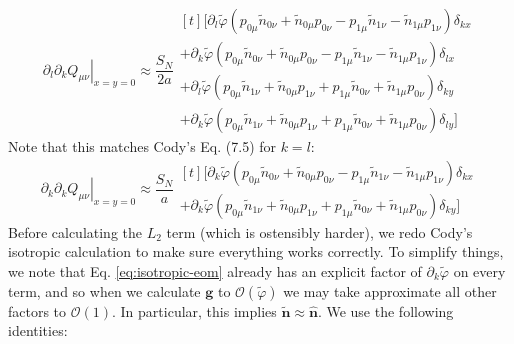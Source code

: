 \documentclass[reqno]{article}
\newcommand{\phitilde}{\tilde{\varphi}}
\begin{document}
\begin{equation}
    \left. \partial_l \partial_k Q_{\mu \nu} \right|_{x = y = 0}
    \approx
    \frac{S_N}{2 a}
    \begin{multlined}[t]
    \biggl[
         \partial_l \phitilde \left( p_{0\mu} \tilde{n}_{0\nu} + \tilde{n}_{0\mu} p_{0\nu} - p_{1\mu} \tilde{n}_{1\nu} - \tilde{n}_{1\mu} p_{1\nu} \right)\delta_{k x} \\
        +  \partial_k \phitilde \left( 
            p_{0\mu} \tilde{n}_{0\nu} + \tilde{n}_{0\mu} p_{0\nu} - p_{1\mu} \tilde{n}_{1\nu} - \tilde{n}_{1\mu} p_{1\nu}
        \right) \delta_{lx} \\
        +  \partial_l \phitilde \left( 
            p_{0\mu} \tilde{n}_{1\nu} + \tilde{n}_{0\mu} p_{1\nu} + p_{1\mu} \tilde{n}_{0\nu} + \tilde{n}_{1\mu} p_{0\nu}
        \right) \delta_{k y} \\
        +  \partial_k \phitilde  \left( 
            p_{0\mu} \tilde{n}_{1\nu} + \tilde{n}_{0\mu} p_{1\nu} + p_{1\mu} \tilde{n}_{0\nu} + \tilde{n}_{1\mu} p_{0\nu}
        \right) \delta_{l y}
    \biggr]
    \end{multlined}
\end{equation}
Note that this matches Cody's Eq. (7.5) for $k = l$:
\begin{equation} \label{eq:isotropic-eom}
    \left. \partial_k \partial_k Q_{\mu \nu} \right|_{x = y = 0}
    \approx
    \frac{S_N}{a}
    \begin{multlined}[t]
    \biggl[
        \partial_k \phitilde \left( 
            p_{0\mu} \tilde{n}_{0\nu} + \tilde{n}_{0\mu} p_{0\nu} - p_{1\mu} \tilde{n}_{1\nu} - \tilde{n}_{1\mu} p_{1\nu}
        \right) \delta_{kx} \\
        +  \partial_k \phitilde  \left( 
            p_{0\mu} \tilde{n}_{1\nu} + \tilde{n}_{0\mu} p_{1\nu} + p_{1\mu} \tilde{n}_{0\nu} + \tilde{n}_{1\mu} p_{0\nu}
        \right) \delta_{k y}
    \biggr]
    \end{multlined}
\end{equation}
Before calculating the $L_2$ term (which is ostensibly harder), we redo Cody's isotropic calculation to make sure everything works correctly.
To simplify things, we note that Eq. \eqref{eq:isotropic-eom} already has an explicit factor of $\partial_k \phitilde$ on every term, and so when we calculate $\mathbf{g}$ to $\mathcal{O}(\phitilde)$ we may take approximate all other factors to $\mathcal{O}(1)$.
In particular, this implies $\mathbf{\tilde{n}} \approx \mathbf{\hat{n}}$.
We use the following identities:
\end{document}
